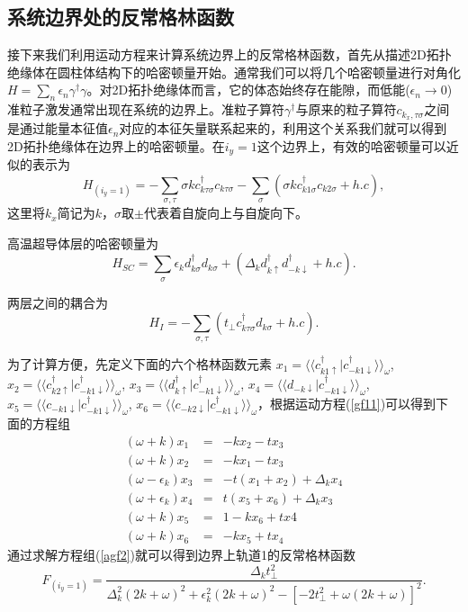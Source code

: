 \subsection{系统边界处的反常格林函数}
接下来我们利用运动方程来计算系统边界上的反常格林函数，首先从描述2D拓扑绝缘体在圆柱体结构下的哈密顿量开始。通常我们可以将几个哈密顿量进行对角化$H=\sum_n\epsilon_n\gamma^\dagger\gamma$。对2D拓扑绝缘体而言，它的体态始终存在能隙，而低能($\epsilon_n\rightarrow 0$)准粒子激发通常出现在系统的边界上。准粒子算符$\gamma^\dagger$与原来的粒子算符$c_{k_x,\tau\sigma}$之间是通过能量本征值$\epsilon_n$对应的本征矢量联系起来的，利用这个关系我们就可以得到2D拓扑绝缘体在边界上的哈密顿量。在$i_y=1$这个边界上，有效的哈密顿量可以近似的表示为
\begin{equation}
H_{(i_y=1)}=-\sum_{\sigma,\tau}\sigma k c_{k\tau\sigma}^\dagger c_{k\tau\sigma}-\sum_\sigma(\sigma k c_{k1\sigma}^\dagger c_{k2\sigma}+h.c),\label{iy1}
\end{equation}
这里将$k_x$简记为$k$，$\sigma$取$\pm$代表着自旋向上与自旋向下。

高温超导体层的哈密顿量为
\begin{equation}
H_{SC}=\sum_\sigma\epsilon_{k} d_{k\sigma}^\dagger d_{k\sigma}+(\Delta_{ k} d_{k\uparrow}^\dagger d_{-k\downarrow}^\dagger+h.c).
\end{equation}

两层之间的耦合为
\begin{equation}
H_I=-\sum_{\sigma,\tau}(t_\perp c_{k\tau\sigma}^\dagger d_{k\sigma}+h.c).
\end{equation}

为了计算方便，先定义下面的六个格林函数元素
$x_1=\langle\langle c_{k1\uparrow}^\dagger|c_{-k1\downarrow}^\dagger$$\rangle$$\rangle_\omega$, $x_2=\langle\langle c_{k2\uparrow}^\dagger|c_{-k1\downarrow}^\dagger$$\rangle$$\rangle_\omega$, $x_3=\langle\langle d_{k\uparrow}^\dagger|c_{-k1\downarrow}^\dagger\rangle\rangle_\omega$, $x_4=\langle\langle d_{-k\downarrow}|c_{-k1\downarrow}^\dagger\rangle\rangle_\omega$, $x_5=\langle\langle c_{-k1\downarrow}|c_{-k1\downarrow}^\dagger\rangle\rangle_\omega$, $x_6=\langle\langle c_{-k2\downarrow}|c_{-k1\downarrow}^\dagger\rangle\rangle_\omega$，根据运动方程(\ref{gf11})可以得到下面的方程组
\begin{subequations}
	\begin{eqnarray}
	(\omega+k)x_1&=&-kx_2-tx_3\\
	(\omega+k)x_2&=&-kx_1-tx_3\\
	(\omega-\epsilon_{k})x_3&=&-t(x_1+x_2)+\Delta_{k} x_4\\
	(\omega+\epsilon_{k})x_4&=&t(x_5+x_6)+\Delta_{k} x_3\\
	(\omega+k)x_5&=&1-k x_6+tx4\\
	(\omega+k)x_6&=&-k x_5+tx_4
	\end{eqnarray}\label{agf2}
\end{subequations}
通过求解方程组(\ref{agf2})就可以得到边界上轨道1的反常格林函数
\begin{equation}
F_{(i_y=1)}=\frac{\Delta_{k} t_\perp^2}{\Delta_k^2(2k+\omega)^2+\epsilon_k^2(2k+\omega)^2-[-2t_\perp^2+\omega(2k+\omega)]^2}.
\end{equation}

